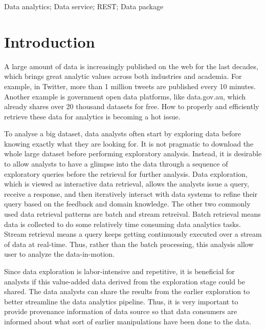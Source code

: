 \documentclass[10pt, conference, compsocconf]{IEEEtran}
\begin{document}
\begin{IEEEkeywords}
Data analytics; Data service; REST; Data package

\end{IEEEkeywords}

\IEEEpeerreviewmaketitle



\section{Introduction}
A large amount of data is increasingly published on the web for the last decades, which brings great analytic values across both industries and academia. For example, in Twitter, more than 1 million tweets are published every 10 minutes. Another example is government open data platforms, like data.gov.au\cite{dataGov}, which already shares over 20 thousand datasets for free. How to properly and efficiently retrieve these data for analytics is becoming a hot issue\cite{jagadish2014big}\cite{sharda2014businesss}.

To analyse a big dataset, data analysts often start by exploring data before knowing exactly what they are looking for. It is not pragmatic to download the whole large dataset before performing exploratory analysis. Instead, it is desirable to allow analysts to have a glimpse into the data through a sequence of exploratory queries before the retrieval for further analysis\cite{khan2014divide}. Data exploration,
which is viewed as interactive data retrieval, allows the analysts issue a query, receive a response, and then iteratively interact with data systems to refine their query based on the feedback and domain knowledge\cite{idreos2015overview}. The other two commonly used data retrieval patterns are batch and stream retreival. Batch retrieval means data is collected to do some relatively time consuming data analytics tasks. Stream retrieval means a query keeps getting continuously executed over a stream of data at real-time. Thus, rather than the batch processing, this analysis allow user to analyze the data-in-motion. 

Since data exploration is labor-intensive and
repetitive, it is beneficial for analysts if this value-added data derived from the exploration stage could be shared. The data analysts can share the results from the earlier exploration to better streamline the data analytics pipeline. Thus, it is very important to provide provenance information of data source so that data consumers are informed about what sort of earlier manipulations have been done to the data.
\end{document}
